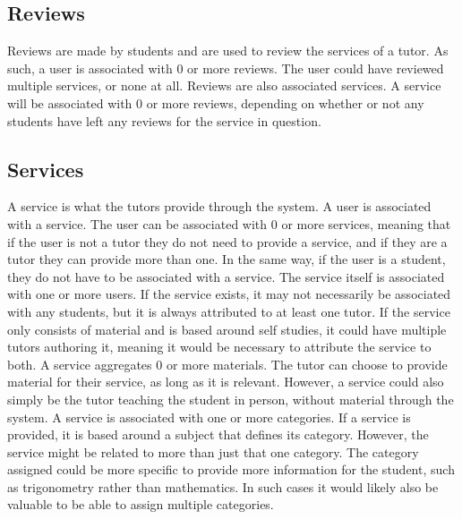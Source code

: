 \subsection{Reviews}
Reviews are made by students and are used to review the services of a tutor.
As such, a user is associated with 0 or more reviews.
The user could have reviewed multiple services, or none at all.
Reviews are also associated services.
A service will be associated with 0 or more reviews, depending on whether or not any students have left any reviews for the service in question.

\subsection{Services}
A service is what the tutors provide through the system.
A user is associated with a service.
The user can be associated with 0 or more services, meaning that if the user is not a tutor they do not need to provide a service, and if they are a tutor they can provide more than one. 
In the same way, if the user is a student, they do not have to be associated with a service.
The service itself is associated with one or more users.
If the service exists, it may not necessarily be associated with any students, but it is always attributed to at least one tutor.
If the service only consists of material and is based around self studies, it could have multiple tutors authoring it, meaning it would be necessary to attribute the service to both.
A service aggregates 0 or more materials.
The tutor can choose to provide material for their service, as long as it is relevant.
However, a service could also simply be the tutor teaching the student in person, without material through the system.
A service is associated with one or more categories.
If a service is provided, it is based around a subject that defines its category.
However, the service might be related to more than just that one category.
The category assigned could be more specific to provide more information for the student, such as trigonometry rather than mathematics.
In such cases it would likely also be valuable to be able to assign multiple categories.
